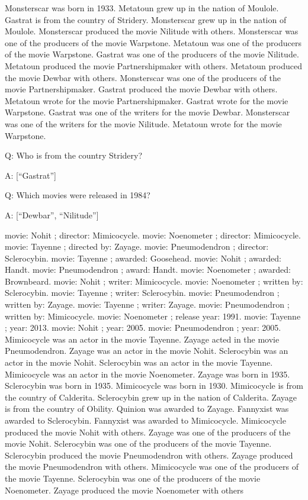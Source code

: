 \documentclass[
]{article}
\begin{document}
Monsterscar was born in 1933. Metatoun grew up in the nation of Moulole.
Gastrat is from the country of Stridery. Monsterscar grew up in the
nation of Moulole. Monsterscar produced the movie Nilitude with others.
Monsterscar was one of the producers of the movie Warpstone. Metatoun
was one of the producers of the movie Warpstone. Gastrat was one of the
producers of the movie Nilitude. Metatoun produced the movie
Partnershipmaker with others. Metatoun produced the movie Dewbar with
others. Monsterscar was one of the producers of the movie
Partnershipmaker. Gastrat produced the movie Dewbar with others.
Metatoun wrote for the movie Partnershipmaker. Gastrat wrote for the
movie Warpstone. Gastrat was one of the writers for the movie Dewbar.
Monsterscar was one of the writers for the movie Nilitude. Metatoun
wrote for the movie Warpstone.

Q: Who is from the country Stridery?

A: {[}``Gastrat''{]}

Q: Which movies were released in 1984?

A: {[}``Dewbar'', ``Nilitude''{]}

movie: Nohit ; director: Mimicocycle. movie: Noenometer ; director:
Mimicocycle. movie: Tayenne ; directed by: Zayage. movie: Pneumodendron
; director: Sclerocybin. movie: Tayenne ; awarded: Goosehead. movie:
Nohit ; awarded: Handt. movie: Pneumodendron ; award: Handt. movie:
Noenometer ; awarded: Brownbeard. movie: Nohit ; writer: Mimicocycle.
movie: Noenometer ; written by: Sclerocybin. movie: Tayenne ; writer:
Sclerocybin. movie: Pneumodendron ; written by: Zayage. movie: Tayenne ;
writer: Zayage. movie: Pneumodendron ; written by: Mimicocycle. movie:
Noenometer ; release year: 1991. movie: Tayenne ; year: 2013. movie:
Nohit ; year: 2005. movie: Pneumodendron ; year: 2005. Mimicocycle was
an actor in the movie Tayenne. Zayage acted in the movie Pneumodendron.
Zayage was an actor in the movie Nohit. Sclerocybin was an actor in the
movie Nohit. Sclerocybin was an actor in the movie Tayenne. Mimicocycle
was an actor in the movie Noenometer. Zayage was born in 1935.
Sclerocybin was born in 1935. Mimicocycle was born in 1930. Mimicocycle
is from the country of Calderita. Sclerocybin grew up in the nation of
Calderita. Zayage is from the country of Obility. Quinion was awarded to
Zayage. Fannyxist was awarded to Sclerocybin. Fannyxist was awarded to
Mimicocycle. Mimicocycle produced the movie Nohit with others. Zayage
was one of the producers of the movie Nohit. Sclerocybin was one of the
producers of the movie Tayenne. Sclerocybin produced the movie
Pneumodendron with others. Zayage produced the movie Pneumodendron with
others. Mimicocycle was one of the producers of the movie Tayenne.
Sclerocybin was one of the producers of the movie Noenometer. Zayage
produced the movie Noenometer with others
\end{document}
